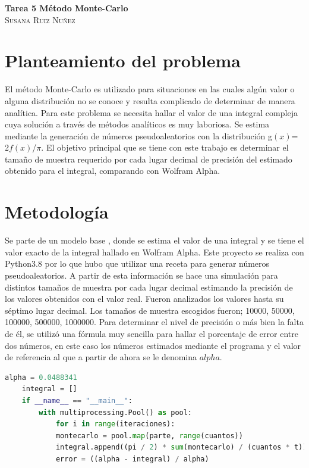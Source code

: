 \documentclass{article}
\begin{document}
	\begin{center}
	\huge{\textbf{Tarea 5 Método Monte-Carlo}}\\
	
	\textsc{ \Large Susana Ruiz Nuñez}
	\end{center}


\section{Planteamiento del problema} 
El método Monte-Carlo \cite{satu} es utilizado para situaciones en las cuales algún valor o alguna distribución no se conoce y resulta complicado de determinar de manera analítica. Para este problema se necesita hallar el valor de una integral compleja cuya solución a través de métodos analíticos es muy laboriosa. Se estima mediante la generación de números pseudoaleatorios con la distribución g$(x)$= 2$f(x)$/$\pi$. El objetivo principal que se tiene con este trabajo es determinar el tamaño de muestra requerido por cada lugar decimal de precisión del estimado obtenido para el integral, comparando con Wolfram Alpha.

\section{Metodología}
Se parte de un modelo base \cite{satu}, donde se estima el valor de una integral y se tiene el valor exacto de la integral hallado en Wolfram Alpha. Este proyecto se realiza con Python3.8 por lo que hubo que utilizar una receta para generar números pseudoaleatorios. A partir de esta información se hace una simulación para distintos tamaños de muestra por cada lugar decimal estimando la precisión de los valores obtenidos con el valor real. Fueron analizados los valores hasta su séptimo lugar decimal. Los tamaños de muestra escogidos fueron; 10000, 50000, 100000, 500000, 1000000. Para determinar el nivel de precisión o más bien la falta de él, se utilizó una fórmula muy sencilla para hallar el porcentaje de error entre dos números, en este caso los números estimados mediante el programa y el valor de referencia al que a partir de ahora se le denomina $alpha$.   
  

\begin{lstlisting}[language=Python]
	alpha = 0.0488341
	integral = []
	if __name__ == "__main__":
		with multiprocessing.Pool() as pool:
			for i in range(iteraciones):
			montecarlo = pool.map(parte, range(cuantos))
			integral.append((pi / 2) * sum(montecarlo) / (cuantos * t))
			error = ((alpha - integral) / alpha)
\end{lstlisting}
\end{document}
